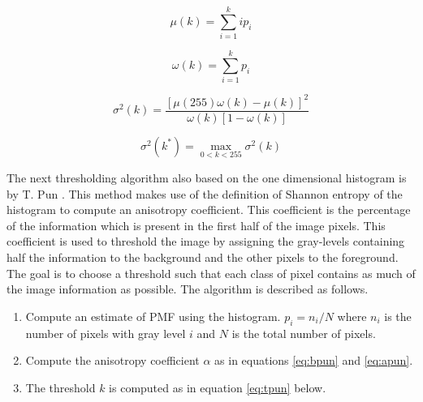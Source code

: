 \documentclass[journal]{IEEEtran}
\begin{document}
\begin{equation}
\mu(k) = \sum_{i=1}^{k}ip_i
\end{equation}

\begin{equation}
\omega(k) = \sum_{i=1}^{k}p_i
\end{equation}

\begin{equation}
\label{eq:otsuobj}
\sigma^2(k) = \frac{[\mu(255)\omega(k) - \mu(k)]^2}{\omega(k)[1-\omega(k)]}
\end{equation}

\begin{equation}
\label{eq:otsumax}
\sigma^2(k^*) = \max_{0<k<255} \sigma^2(k)
\end{equation}

\par The next thresholding algorithm also based on the one dimensional histogram is by T. Pun \cite{pun}. This method makes use of the definition of Shannon entropy of the histogram to compute an anisotropy coefficient. This coefficient is the percentage of the information which is present in the first half of the image pixels. This coefficient is used to threshold the image by assigning the gray-levels containing half the information to the background and the other pixels to the foreground. The goal is to choose a threshold such that each class of pixel contains as much of the image information as possible. The algorithm is described as follows.

\begin{enumerate}
\item Compute an estimate of PMF using the histogram. \begin{math}p_i = n_i/N\end{math} where \begin{math}n_i\end{math} is the number of pixels with gray level \begin{math}i\end{math} and \begin{math}N\end{math} is the total number of pixels.
\item Compute the anisotropy coefficient \begin{math}\alpha\end{math} as in equations \ref{eq:bpun} and \ref{eq:apun}.
\item The threshold \begin{math}k\end{math} is computed as in equation \ref{eq:tpun} below.
\end{enumerate}
\end{document}
